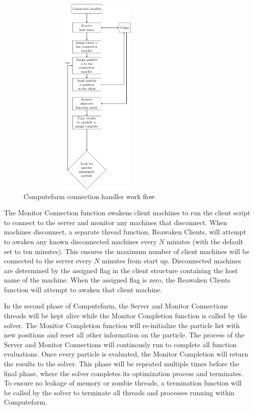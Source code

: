 \begin{figure}[h!]
    \centering
    \includegraphics[width=8cm,height=10cm]{chapters/chapter_3_Software/connection_handler.pdf}
    \caption{Computefarm connection handler work flow}
    \label{fig:connection handler}
\end{figure}

The Monitor Connection function awakens client machines to run the client script to connect to the server and monitor any machines that disconnect. When machines disconnect, a separate thread function, Reawaken Clients, will attempt to awaken any known disconnected machines every $N$ minutes (with the default set to ten minutes). This ensures the maximum number of client machines will be connected to the server every $N$ minutes from start up. Disconnected machines are determined by the assigned flag in the client structure containing the host name of the machine. When the assigned flag is zero, the Reawaken Clients function will attempt to awaken that client machine. 


In the second phase of Computefarm, the Server and Monitor Connections threads will be kept alive while the Monitor Completion function is called by the solver. The Monitor Completion function will re-initialize the particle list with new positions and reset all other information on the particle. The process of the Server and Monitor Connections will continously run to complete all function evaluations. Once every particle is evaluated, the Monitor Completion will return the results to the solver. This phase will be repeated multiple times before the final phase, where the solver completes its optimization process and terminates. To ensure no leakage of memory or zombie threads, a termination function will be called by the solver to terminate all threads and processes running within Computefarm. 


